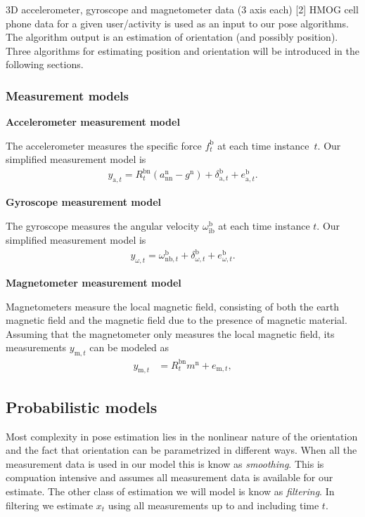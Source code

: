 \documentclass{article}
\begin{document}
3D accelerometer, gyroscope and magnetometer data (3 axis each)  [2] HMOG cell phone data for a given user/activity
is used as an input to our pose algorithms. The algorithm output is an estimation of orientation (and possibly position).
Three algorithms for estimating position and orientation will be introduced in the following sections.

\subsubsection{Measurement models}

\textbf{Accelerometer measurement model}

The accelerometer measures the specific force $f^\text{b}_t$ at each time instance~$t$. Our simplified measurement model is
\begin{align}
\label{eq:models-accMeasModel}
y_{\text{a},t} 
= R^{\text{bn}}_t  ( a_{\text{nn}}^\text{n} - g^\text{n} )
+ \delta_{\text{a},t}^\text{b}
+ e_{\text{a},t}^\text{b}.
\end{align} 

\textbf{Gyroscope measurement model}

The gyroscope measures the angular velocity $\omega_{\text{ib}}^\text{b}$ at each time instance $t$. Our simplified
measurement model is
\begin{align}
\label{eq:models-gyrMeasModel}
y_{\omega,t} = \omega_{\text{nb},t}^\text{b} + \delta_{\omega,t}^\text{b} + e_{\omega,t}^\text{b}.
\end{align}

\textbf{Magnetometer measurement model}

Magnetometers measure the local magnetic field, consisting of both the earth magnetic field and the magnetic field due to the presence of magnetic material.
Assuming that the magnetometer only measures the local magnetic field, its measurements $y_{\text{m},t}$ can be modeled as
\begin{align}
\label{eq:models-magMeasModel}
y_{\text{m},t} &= R^\text{bn}_t m^\text{n} + e_{\text{m},t}, 
\end{align}

\subsection{Probabilistic models}

Most complexity in pose estimation lies in the nonlinear nature of the orientation and the fact that orientation can be parametrized in different ways.
When all the measurement data is used in our model this is know as \textit{smoothing}. This is compuation intensive and assumes all measurement data is available
for our estimate. The other class of estimation we will model is know as \textit{filtering}. In filtering we estimate $x_t$ using all measurements up to and including time $t$.
\end{document}
